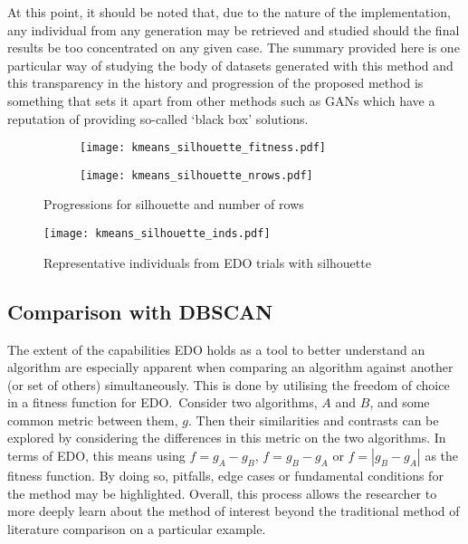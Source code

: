 At this point, it should be noted that, due to the nature of the implementation,
any individual from any generation may be retrieved and studied should the final
results be too concentrated on any given case. The summary provided here is one
particular way of studying the body of datasets generated with this method and
this transparency in the history and progression of the proposed method is
something that sets it apart from other methods such as GANs which have a
reputation of providing so-called `black box' solutions.

\begin{figure}
    \centering
    \begin{subfigure}{\imgwidth}
        \texttt{[image: kmeans\_silhouette\_fitness.pdf]}
        \label{fig:kmeans_silhouette_fitness}
    \end{subfigure}

    \begin{subfigure}{\imgwidth}
        \texttt{[image: kmeans\_silhouette\_nrows.pdf]}
        \label{fig:kmeans_silhouette_nrows}
    \end{subfigure}
    \caption{%
        Progressions for silhouette and number of rows
    }\label{fig:silhouette_progression}
\end{figure}

\begin{figure}
    \centering
    \texttt{[image: kmeans\_silhouette\_inds.pdf]}
    \caption{%
        Representative individuals from EDO trials with silhouette
    }\label{fig:kmeans_silhouette_inds}
\end{figure}

\subsection{Comparison with DBSCAN}\label{subsec:dbscan}

The extent of the capabilities EDO holds as a tool to better understand an
algorithm are especially apparent when comparing an algorithm against another
(or set of others) simultaneously. This is done by utilising the freedom of
choice in a fitness function for EDO.\ Consider two algorithms, \(A\) and \(B\),
and some common metric between them, \(g\). Then their similarities and
contrasts can be explored by considering the differences in this metric on the
two algorithms. In terms of EDO, this means using \(f = g_A - g_B\), \(f = g_B -
g_A\) or \(f = \left| g_B - g_A \right|\) as the fitness function. By doing so,
pitfalls, edge cases or fundamental conditions for the method may be
highlighted. Overall, this process allows the researcher to more deeply learn
about the method of interest beyond the traditional method of literature
comparison on a particular example.

